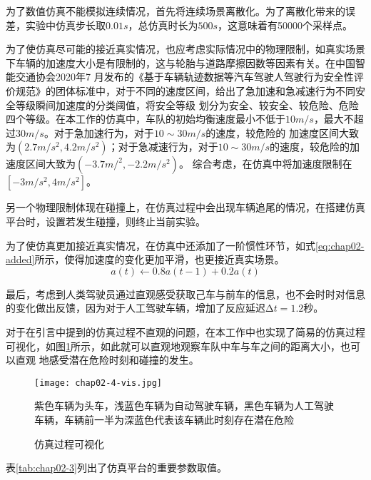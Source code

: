 为了数值仿真不能模拟连续情况，首先将连续场景离散化。为了离散化带来的误差，实验中仿真步长取$0.01s$，总仿真时长为$500s$，这意味着有50000个采样点。

为了使仿真尽可能的接近真实情况，也应考虑实际情况中的物理限制，如真实场景下车辆的加速度大小是有限制的，这与轮胎与道路摩擦因数等因素有关。在中国智能交通协会2020年7
月发布的《基于车辆轨迹数据等汽车驾驶人驾驶行为安全性评价规范》的团体标准中，对于不同的速度区间，给出了急加速和急减速行为不同安全等级瞬间加速度的分类阈值，将安全等级
划分为安全、较安全、较危险、危险四个等级。在本工作的仿真中，车队的初始均衡速度最小不低于$10m/s$，最大不超过$30m/s$。对于急加速行为，对于$10\sim 30m/s$的速度，较危险的
加速度区间大致为$(2.7m/s^2, 4.2m/s^2)$；对于急减速行为，对于$10\sim 30m/s$的速度，较危险的加速度区间大致为$(-3.7m/^2, -2.2m/s^2)$\cite{2020safety}。
综合考虑，在仿真中将加速度限制在$[-3m/s^2, 4m/s^2]$。

另一个物理限制体现在碰撞上，在仿真过程中会出现车辆追尾的情况，在搭建仿真平台时，设置若发生碰撞，则终止当前实验。

为了使仿真更加接近真实情况，在仿真中还添加了一阶惯性环节，如式\ref{eq:chap02-added}所示，使得加速度的变化更加平滑，也更接近真实场景。
\begin{equation}
  a(t) \leftarrow 0.8a(t-1) + 0.2a(t)
  \label{eq:chap02-added}
\end{equation}

最后，考虑到人类驾驶员通过直观感受获取己车与前车的信息，也不会时时对信息的变化做出反馈，因为对于人工驾驶车辆，增加了反应延迟$\increment{t} = 1.2$秒。

对于在引言中提到的仿真过程不直观的问题，在本工作中也实现了简易的仿真过程可视化，如图\ref{fig:chap02-4-vis}所示，如此就可以直观地观察车队中车与车之间的距离大小，也可以直观
地感受潜在危险时刻和碰撞的发生。

\begin{figure}
  \centering
  \texttt{[image: chap02-4-vis.jpg]}
  \caption*{紫色车辆为头车，浅蓝色车辆为自动驾驶车辆，黑色车辆为人工驾驶车辆，车辆前一半为深蓝色代表该车辆此时刻存在潜在危险}
  \caption{仿真过程可视化}
  \label{fig:chap02-4-vis}
\end{figure}

表\ref{tab:chap02-3}列出了仿真平台的重要参数取值。

